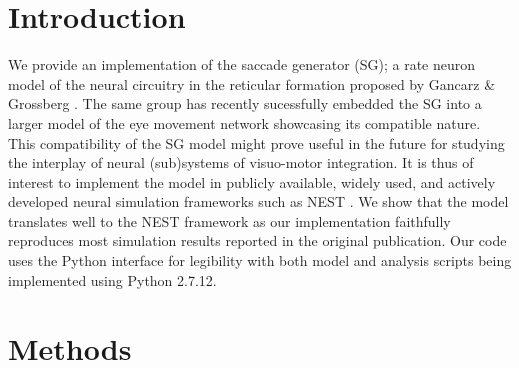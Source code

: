 \documentclass[10pt,a4paper,onecolumn]{article}
\begin{document}
\section{Introduction}\label{introduction}

We provide an implementation of the saccade generator (SG); a rate
neuron model of the neural circuitry in the reticular formation proposed
by Gancarz \& Grossberg \autocite{Gancarz1998}. The same group has
recently sucessfully embedded the SG into a larger model of the eye
movement network \autocite{Grossberg2012} showcasing its compatible
nature. This compatibility of the SG model might prove useful in the
future for studying the interplay of neural (sub)systems of visuo-motor
integration. It is thus of interest to implement the model in publicly
available, widely used, and actively developed neural simulation
frameworks such as NEST \autocite{Gewaltig2007}. We show that the model
translates well to the NEST framework as our implementation faithfully
reproduces most simulation results reported in the original publication.
Our code uses the Python interface \autocite{Eppler2008} for legibility
with both model and analysis scripts being implemented using Python
2.7.12.

\section{Methods}\label{methods}
\end{document}
